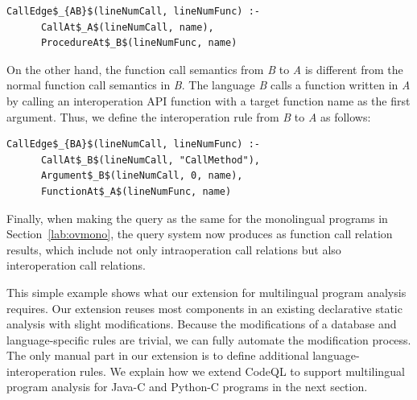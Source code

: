 
\begin{lstlisting}[style=mrule]
    CallEdge$_{AB}$(lineNumCall, lineNumFunc) :-
      CallAt$_A$(lineNumCall, name),
      ProcedureAt$_B$(lineNumFunc, name)
\end{lstlisting}

\noindent
On the other hand, the function call semantics from {\it B} to {\it A} is
different from the normal function call semantics in {\it B}. The language {\it B} calls
a function written in {\it A} by calling an interoperation API function  with a target function name as the first argument. Thus, we define
the interoperation rule from {\it B} to {\it A} as follows: 


\begin{lstlisting}[style=mrule]
    CallEdge$_{BA}$(lineNumCall, lineNumFunc) :-
      CallAt$_B$(lineNumCall, "CallMethod"),
      Argument$_B$(lineNumCall, 0, name),
      FunctionAt$_A$(lineNumFunc, name)
\end{lstlisting}

%

Finally, when making the query  as the same for the
monolingual programs in Section~\ref{lab:ovmono}, the query system now produces
  as function call
relation results, which include not only intraoperation call relations but also
interoperation call relations. 

This simple example shows what our extension for multilingual program analysis
requires. Our extension reuses most components in an existing declarative static
analysis with slight modifications. Because the modifications of a database and
language-specific rules are trivial, we can fully automate the modification
process.  The only manual part in our extension is to define additional
language-interoperation rules. We explain how we extend CodeQL to support
multilingual program analysis for Java-C and Python-C programs in the next section.

